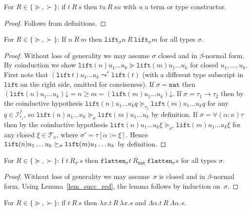 \documentclass[a4paper,UKenglish,cleveref,autoref,numberwithinsect]{lipics-v2019}
\theoremstyle{definition}
\newcommand{\Iterms}{\mathcal{I}}
\newcommand{\arrtype}{\rightarrow}
\newcommand{\subst}[2]{#1:=#2}
\newcommand{\abs}[2]{\lambda #1.#2}
\newcommand{\tabs}[2]{\Lambda #1.#2}
\newcommand{\nat}{\mathtt{nat}}
\newcommand{\flatten}{\mathtt{flatten}}
\newcommand{\lift}{\mathtt{lift}}
\newcommand{\Tc}{\mathcal{T}}
\newcommand{\da}{\mathord{\downarrow}}
\begin{document}
\begin{lemma}\label{lem_app_succ}
  For $R \in \{\succeq,\succ\}$: if $t\:R\:s$ then $t u\:R\:s u$ with
  $u$ a term or type constructor.
\end{lemma}

\begin{proof}
  Follows from definitions.
\end{proof}

\begin{lemma}\label{lem:liftgreater}
  For $R \in \{\succeq,\succ\}$: If $n\:R\:m$ then
  $\lift_\sigma n\:R\:\lift_\sigma m$ for all types $\sigma$.
\end{lemma}

\begin{proof}
  Without loss of generality we may assume $\sigma$ closed and in
  $\beta$-normal form. By coinduction we show $\lift(n) u_1 \ldots u_k
  \succeq \lift(m) u_1 \ldots u_k$ for closed $u_1,\ldots,u_k$. First
  note that $(\lift\,t) u_1 \ldots u_k \leadsto^* \lift(t)$ (with a
  different type subscript in~$\lift$ on the right side, omitted
  for conciseness). If $\sigma = \nat$ then $(\lift(n) u_1 \ldots
  u_k)\da = n \ge m = (\lift(m) u_1 \ldots u_k)\da$. If $\sigma =
  \tau_1\arrtype\tau_2$ then by the coinductive hypothesis $\lift(n)
  u_1 \ldots u_k q \succeq_{\tau_2} \lift(m) u_1 \ldots u_k q$ for any
  $q \in \Iterms^f_{\tau_1}$, so $\lift(n) u_1 \ldots u_k
  \succeq_{\sigma} \lift(m) u_1 \ldots u_k$ by definition. If $\sigma
  = \forall(\alpha:\kappa)\tau$ then by the coinductive hypothesis
  $\lift(n) u_1 \ldots u_k \xi \succeq_{\sigma'} \lift(m) u_1 \ldots
  u_k \xi$ for any closed $\xi \in \Tc_\kappa$, where $\sigma' =
  \tau[\subst{\alpha}{\xi}]$. Hence $\lift(n) u_1 \ldots u_k
  \pagebreak
  \succeq_{\sigma} \lift(m) u_1 \ldots u_k$ by definition.
\end{proof}

\begin{lemma}\label{lem_flatten_succ}
  For $R \in \{\succeq,\succ\}$: f $t\:R_\sigma\:s$ then
  $\flatten_\sigma t\:R_\nat\: \flatten_\sigma s$ for all types
  $\sigma$.
\end{lemma}

\begin{proof}
  Without loss of generality we may assume~$\sigma$ is closed and in
  $\beta$-normal form. Using Lemma~\ref{lem_succ_red}, the lemma
  follows by induction on~$\sigma$.
\end{proof}

\begin{lemma}\label{lem_abs_succ}
  For $R \in \{\succeq,\succ\}$: if $t\:R\:s$ then
  $\abs{x}{t}\:R\:\abs{x}{s}$ and
  $\tabs{\alpha}{t}\:R\:\tabs{\alpha}{s}$.
\end{lemma}
\end{document}
